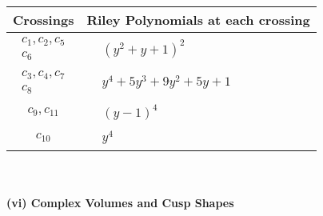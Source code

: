 \documentclass[1p]{elsarticle_modified}
\theoremstyle{definition}
\begin{document}
\begin{tabular}{m{50pt}|m{274pt}}
Crossings & \hspace{64pt}Riley Polynomials at each crossing \\
\hline $$\begin{aligned}c_{1},c_{2},c_{5}\\c_{6}\end{aligned}$$&$\begin{aligned}
&(y^2+y+1)^2
\end{aligned}$\\
\hline $$\begin{aligned}c_{3},c_{4},c_{7}\\c_{8}\end{aligned}$$&$\begin{aligned}
&y^4+5 y^3+9 y^2+5 y+1
\end{aligned}$\\
\hline $$\begin{aligned}c_{9},c_{11}\end{aligned}$$&$\begin{aligned}
&(y-1)^4
\end{aligned}$\\
\hline $$\begin{aligned}c_{10}\end{aligned}$$&$\begin{aligned}
&y^4
\end{aligned}$\\
\hline
\end{tabular}\\~\\
\newpage\flushleft \textbf{(vi) Complex Volumes and Cusp Shapes}
\end{document}
